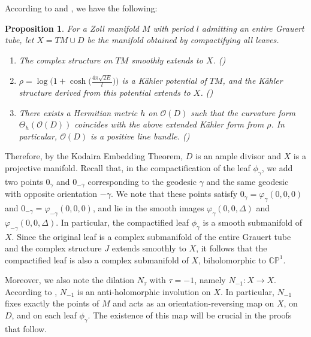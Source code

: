 \documentclass[a4paper, 12pt]{article}
\newcommand{\oX}{X}
\newcommand{\cO}{\mathcal{O}}
\newtheorem{prop}[thm]{Proposition}
\begin{document}


According to \cite{BL18} and \cite{L14}, we have the following:

\begin{prop}\label{comp}
For a Zoll manifold $M$ with period $l$ admitting an entire Grauert tube, let $\oX=TM\cup D$ be the manifold obtained by compactifying all leaves.
\begin{enumerate}[label=(\roman*)]
\item The complex structure on $TM$ smoothly extends to $X$. (\cite[Lemma 5]{BL18})
\item $\rho=\log\bigl(1+\cosh\bigl(\frac{4\pi\sqrt{2E}}{l}\bigr)\bigr)$ is a K\"ahler potential of $TM$, and the K\"ahler structure derived from this potential extends to $\oX$. (\cite[Proposition III.46]{L14})
\item There exists a Hermitian metric $h$ on $\cO(D)$ such that the curvature form $\Theta_h(\cO(D))$ coincides with the above extended K\"ahler form from $\rho$. In particular, $\cO(D)$ is a positive line bundle. (\cite[Lemma 6]{BL18})
\end{enumerate}
\end{prop}

Therefore, by the Kodaira Embedding Theorem, $D$ is an ample divisor and $\oX$ is a projective manifold. Recall that, in the compactification of the leaf $\phi_\gamma$, we add two points $0_\gamma$ and $0_{-\gamma}$ corresponding to the geodesic $\gamma$ and the same geodesic with opposite orientation $-\gamma$. We note that these points satisfy $0_\gamma=\varphi_\gamma(0,0,0)$ and $0_{-\gamma}=\varphi_{-\gamma}(0,0,0)$, and lie in the smooth images $\varphi_\gamma(0,0,\Delta)$ and $\varphi_{-\gamma}(0,0,\Delta)$. In particular, the compactified leaf $\phi_\gamma$ is a smooth submanifold of $X$. Since the original leaf is a complex submanifold of the entire Grauert tube and the complex structure $J$ extends smoothly to $X$, it follows that the compactified leaf is also a complex submanifold of $X$, biholomorphic to $\mathbb{CP}^1$.

Moreover, we also note the dilation $N_\tau$ with $\tau=-1$, namely $N_{-1}:\oX\rightarrow\oX$. According to \cite{LS91}, $N_{-1}$ is an anti-holomorphic involution on $X$. In particular, $N_{-1}$ fixes exactly the points of $M$ and acts as an orientation-reversing map on $X$, on $D$, and on each leaf $\phi_\gamma$. The existence of this map will be crucial in the proofs that follow.
\end{document}
